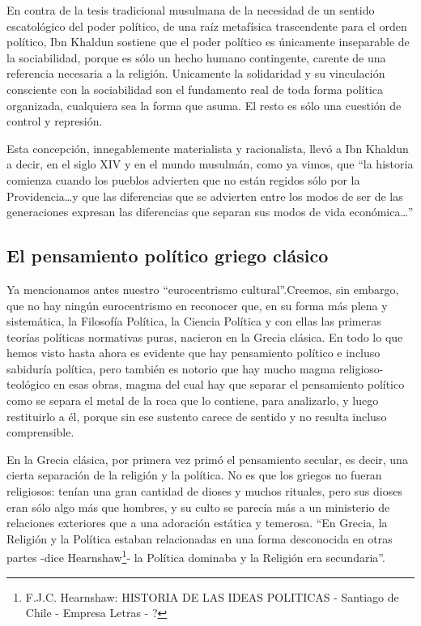 \documentclass[
]{book}
\begin{document}
En contra de la tesis tradicional musulmana de la necesidad de un sentido escatológico del poder político, de una raíz metafísica trascendente para el orden político, Ibn Khaldun sostiene que el poder político es únicamente inseparable de la sociabilidad, porque es sólo un hecho humano contingente, carente de una referencia necesaria a la religión. Unicamente la solidaridad y su vinculación consciente con la sociabilidad son el fundamento real de toda forma política organizada, cualquiera sea la forma que asuma. El resto es sólo una cuestión de control y represión.

Esta concepción, innegablemente materialista y racionalista, llevó a Ibn Khaldun a decir, en el siglo XIV y en el mundo musulmán, como ya vimos, que ``la historia comienza cuando los pueblos advierten que no están regidos sólo por la Providencia\ldots y que las diferencias que se advierten entre los modos de ser de las generaciones expresan las diferencias que separan sus modos de vida económica\ldots{}''

\hypertarget{el-pensamiento-poluxedtico-griego-cluxe1sico}{%
\subsection*{El pensamiento político griego clásico}\label{el-pensamiento-poluxedtico-griego-cluxe1sico}}

Ya mencionamos antes nuestro ``eurocentrismo cultural''.Creemos, sin embargo, que no hay ningún eurocentrismo en reconocer que, en su forma más plena y sistemática, la Filosofía Política, la Ciencia Política y con ellas las primeras teorías políticas normativas puras, nacieron en la Grecia clásica. En todo lo que hemos visto hasta ahora es evidente que hay pensamiento político e incluso sabiduría política, pero también es notorio que hay mucho magma religioso-teológico en esas obras, magma del cual hay que separar el pensamiento político como se separa el metal de la roca que lo contiene, para analizarlo, y luego restituirlo a él, porque sin ese sustento carece de sentido y no resulta incluso comprensible.

En la Grecia clásica, por primera vez primó el pensamiento secular, es decir, una cierta separación de la religión y la política. No es que los griegos no fueran religiosos: tenían una gran cantidad de dioses y muchos rituales, pero sus dioses eran sólo algo más que hombres, y su culto se parecía más a un ministerio de relaciones exteriores que a una adoración estática y temerosa. ``En Grecia, la Religión y la Política estaban relacionadas en una forma desconocida en otras partes -dice Hearnshaw\footnote{F.J.C. Hearnshaw: HISTORIA DE LAS IDEAS POLITICAS - Santiago de Chile - Empresa Letras - ?}- la Política dominaba y la Religión era secundaria''.
\end{document}
